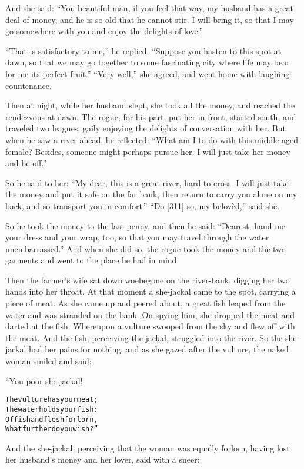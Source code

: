 \documentclass{article}
\renewenvironment{verbatim}{\begin{alltt}\normalfont\begin{centering}}{\end{centering}\end{alltt}}
\begin{document}
And she said:
``You beautiful man, if you feel that way, my husband has a great deal of money, and he is so old that he cannot stir. I will bring it, so that I may go somewhere with you and enjoy the delights of love.''

``That is satisfactory to me,'' he replied.
``Suppose you hasten to this spot at dawn, so that we may go together to some fascinating city where life may bear for me its perfect fruit.''
``Very well,'' she agreed, and went home with laughing
countenance.

Then at night, while her husband slept, she took all the money, and
reached the rendezvous at dawn. The rogue, for his part, put her in
front, started south, and traveled two leagues, gaily enjoying the
delights of conversation with her. But when he saw a river ahead,
he reflected:
``What am I to do with this middle-aged female? Besides, someone might perhaps pursue her. I will just take her money and be off.''

So he said to her:
``My dear, this is a great river, hard to cross. I will just take the money and put it safe on the far bank, then return to carry you alone on my back, and so transport you in comfort.''
``Do [311] so, my belovèd,'' said she.

So he took the money to the last penny, and then he said:
``Dearest, hand me your dress and your wrap, too, so that you may travel through the water unembarrassed.''
And when she did so, the rogue took the money and the two garments
and went to the place he had in mind.

Then the farmer's wife sat down woebegone on the river-bank,
digging her two hands into her throat. At that moment a she-jackal
came to the spot, carrying a piece of meat. As she came up and
peered about, a great fish leaped from the water and was stranded
on the bank. On spying him, she dropped the meat and darted at the
fish. Whereupon a vulture swooped from the sky and flew off with
the meat. And the fish, perceiving the jackal, struggled into the
river. So the she-jackal had her pains for nothing, and as she
gazed after the vulture, the naked woman smiled and said:

“You poor she-jackal!

\begin{verbatim}
The vulture has your meat;
    The water holds your fish:
Of fish and flesh forlorn,
    What further do you wish?”
\end{verbatim}
And the she-jackal, perceiving that the woman was equally forlorn,
having lost her husband's money and her lover, said with a sneer:
\end{document}
